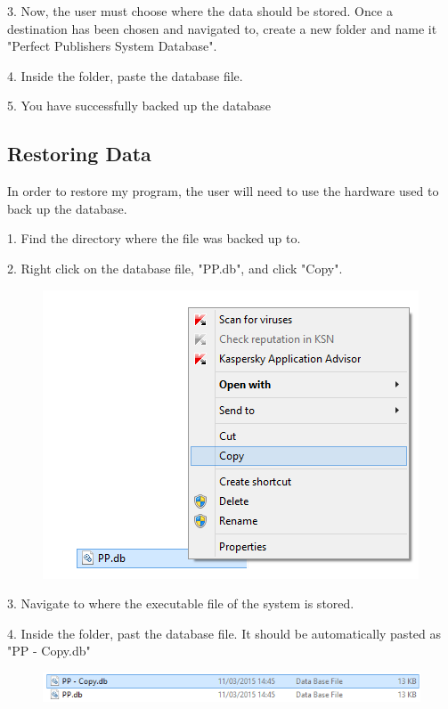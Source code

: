 3. Now, the user must choose where the data should be stored. Once a destination has been chosen and navigated to, create a new folder and name it "Perfect Publishers System Database".

4. Inside the folder, paste the database file.

5. You have successfully backed up the database

\subsection{Restoring Data}

In order to restore my program, the user will need to use the hardware used to back up the database.

1. Find the directory where the file was backed up to.

2. Right click on the database file, "PP.db", and click "Copy".

\begin{figure}[H]
    \includegraphics[width=\textwidth]{./Manual/CopyBackup.png}
\end{figure}

3. Navigate to where the executable file of the system is stored.

4. Inside the folder, past the database file. It should be automatically pasted as "PP - Copy.db"

\begin{figure}[H]
    \includegraphics[width=\textwidth]{./Manual/CopiedFile.png}
\end{figure}

